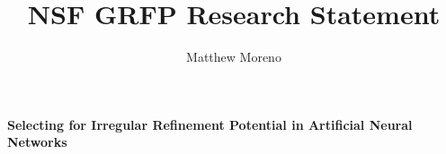 \documentclass[a4paper]{article}
\title{NSF GRFP Research Statement}
\author{Matthew Moreno}
\begin{document}
\begin{center}
{ \Large
 \textbf{Selecting for Irregular Refinement Potential in Artificial Neural Networks}
}
\end{center}
\vspace{-4ex}











\doublespacing

%

%

%

\clearpage
\printbibliography
\end{document}
